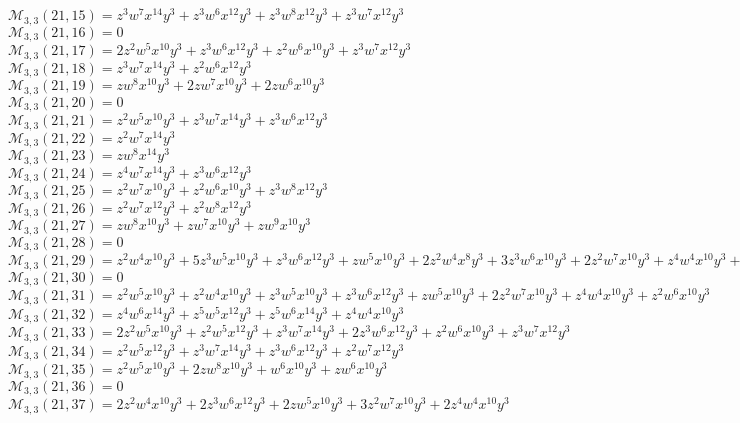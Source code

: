 \documentclass[12pt]{memoireuqam1.3}
\begin{document}
$\mathcal{M}_{3,3}(21,15)=z^3w^7x^{14}y^3+z^3w^6x^{12}y^3+z^3w^8x^{12}y^3+z^3w^7x^{12}y^3$\\
$\mathcal{M}_{3,3}(21,16)=0$\\
$\mathcal{M}_{3,3}(21,17)=2z^2w^5x^{10}y^3+z^3w^6x^{12}y^3+z^2w^6x^{10}y^3+z^3w^7x^{12}y^3$\\
$\mathcal{M}_{3,3}(21,18)=z^3w^7x^{14}y^3+z^2w^6x^{12}y^3$\\
$\mathcal{M}_{3,3}(21,19)=zw^8x^{10}y^3+2zw^7x^{10}y^3+2zw^6x^{10}y^3$\\
$\mathcal{M}_{3,3}(21,20)=0$\\
$\mathcal{M}_{3,3}(21,21)=z^2w^5x^{10}y^3+z^3w^7x^{14}y^3+z^3w^6x^{12}y^3$\\
$\mathcal{M}_{3,3}(21,22)=z^2w^7x^{14}y^3$\\
$\mathcal{M}_{3,3}(21,23)=zw^8x^{14}y^3$\\
$\mathcal{M}_{3,3}(21,24)=z^4w^7x^{14}y^3+z^3w^6x^{12}y^3$\\
$\mathcal{M}_{3,3}(21,25)=z^2w^7x^{10}y^3+z^2w^6x^{10}y^3+z^3w^8x^{12}y^3$\\
$\mathcal{M}_{3,3}(21,26)=z^2w^7x^{12}y^3+z^2w^8x^{12}y^3$\\
$\mathcal{M}_{3,3}(21,27)=zw^8x^{10}y^3+zw^7x^{10}y^3+zw^9x^{10}y^3$\\
$\mathcal{M}_{3,3}(21,28)=0$\\
$\mathcal{M}_{3,3}(21,29)=z^2w^4x^{10}y^3+5z^3w^5x^{10}y^3+z^3w^6x^{12}y^3+zw^5x^{10}y^3+2z^2w^4x^8y^3+3z^3w^6x^{10}y^3+2z^2w^7x^{10}y^3+z^4w^4x^{10}y^3+z^2w^5x^8y^3$\\
$\mathcal{M}_{3,3}(21,30)=0$\\
$\mathcal{M}_{3,3}(21,31)=z^2w^5x^{10}y^3+z^2w^4x^{10}y^3+z^3w^5x^{10}y^3+z^3w^6x^{12}y^3+zw^5x^{10}y^3+2z^2w^7x^{10}y^3+z^4w^4x^{10}y^3+z^2w^6x^{10}y^3$\\
$\mathcal{M}_{3,3}(21,32)=z^4w^6x^{14}y^3+z^5w^5x^{12}y^3+z^5w^6x^{14}y^3+z^4w^4x^{10}y^3$\\
$\mathcal{M}_{3,3}(21,33)=2z^2w^5x^{10}y^3+z^2w^5x^{12}y^3+z^3w^7x^{14}y^3+2z^3w^6x^{12}y^3+z^2w^6x^{10}y^3+z^3w^7x^{12}y^3$\\
$\mathcal{M}_{3,3}(21,34)=z^2w^5x^{12}y^3+z^3w^7x^{14}y^3+z^3w^6x^{12}y^3+z^2w^7x^{12}y^3$\\
$\mathcal{M}_{3,3}(21,35)=z^2w^5x^{10}y^3+2zw^8x^{10}y^3+w^6x^{10}y^3+zw^6x^{10}y^3$\\
$\mathcal{M}_{3,3}(21,36)=0$\\
$\mathcal{M}_{3,3}(21,37)=2z^2w^4x^{10}y^3+2z^3w^6x^{12}y^3+2zw^5x^{10}y^3+3z^2w^7x^{10}y^3+2z^4w^4x^{10}y^3$\\
\end{document}
